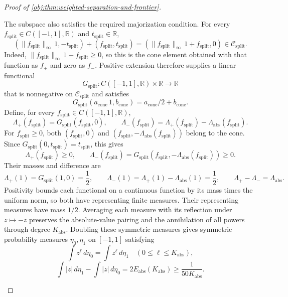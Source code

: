 \begin{proof}[Proof of \cref{obj:thm:weighted-separation-and-frontier}]
\begin{enumerate}
The subspace also satisfies the required majorization condition. For every
\(f_{\mathrm{split}}\in C([-1,1],\mathbb R)\) and
\(t_{\mathrm{split}}\in\mathbb R\),
\[
(\|f_{\mathrm{split}}\|_\infty\,1,-t_{\mathrm{split}})
 +(f_{\mathrm{split}},t_{\mathrm{split}})
=(\|f_{\mathrm{split}}\|_\infty\,1+f_{\mathrm{split}},0)
\in\mathcal C_{\mathrm{split}}.
\]
Indeed, \(\|f_{\mathrm{split}}\|_\infty\,1+f_{\mathrm{split}}\ge0\), so this is the cone element obtained with that function as \(f_+\) and zero as \(f_-\). Positive extension therefore supplies a linear functional
\[
G_{\mathrm{split}}:C([-1,1],\mathbb R)\times\mathbb R\longrightarrow\mathbb R
\]
that is nonnegative on \(\mathcal C_{\mathrm{split}}\) and satisfies
\[
G_{\mathrm{split}}(a_{\mathrm{cone}}\,1,b_{\mathrm{cone}})
=a_{\mathrm{cone}}/2+b_{\mathrm{cone}}.
\]
Define, for every \(f_{\mathrm{split}}\in C([-1,1],\mathbb R)\),
\[
\Lambda_+(f_{\mathrm{split}})=G_{\mathrm{split}}(f_{\mathrm{split}},0),
\qquad
\Lambda_-(f_{\mathrm{split}})
=\Lambda_+(f_{\mathrm{split}})-\Lambda_{\mathrm{abs}}(f_{\mathrm{split}}).
\]
For \(f_{\mathrm{split}}\ge0\), both
\((f_{\mathrm{split}},0)\) and
\((f_{\mathrm{split}},-\Lambda_{\mathrm{abs}}(f_{\mathrm{split}}))\) belong to the cone. Since
\(G_{\mathrm{split}}(0,t_{\mathrm{split}})=t_{\mathrm{split}}\), this gives
\[
\Lambda_+(f_{\mathrm{split}})\ge0,
\qquad
\Lambda_-(f_{\mathrm{split}})
=G_{\mathrm{split}}(f_{\mathrm{split}},-\Lambda_{\mathrm{abs}}(f_{\mathrm{split}}))\ge0.
\]
Their masses and difference are
\[
\Lambda_+(1)=G_{\mathrm{split}}(1,0)=\frac12,
\qquad
\Lambda_-(1)=\Lambda_+(1)-\Lambda_{\mathrm{abs}}(1)=\frac12,
\qquad
\Lambda_+-\Lambda_-=\Lambda_{\mathrm{abs}}.
\]
Positivity bounds each functional on a continuous function by its mass times the uniform norm, so both have representing finite measures.
Their representing measures have mass \(1/2\). Averaging each measure with its reflection under \(z\mapsto-z\) preserves the absolute-value pairing and the annihilation of all powers through degree \(K_{\mathrm{abs}}\). Doubling these symmetric measures gives symmetric probability measures
\(\eta_0,\eta_1\) on \([-1,1]\) satisfying
\[
\int z^\ell\,d\eta_0=\int z^\ell\,d\eta_1
\quad(0\le\ell\le K_{\mathrm{abs}}),
\]
\[
\int|z|\,d\eta_1-\int|z|\,d\eta_0
=2E_{\mathrm{abs}}(K_{\mathrm{abs}})
\ge\frac1{50K_{\mathrm{abs}}}.
\]


\end{enumerate}
\end{proof}
